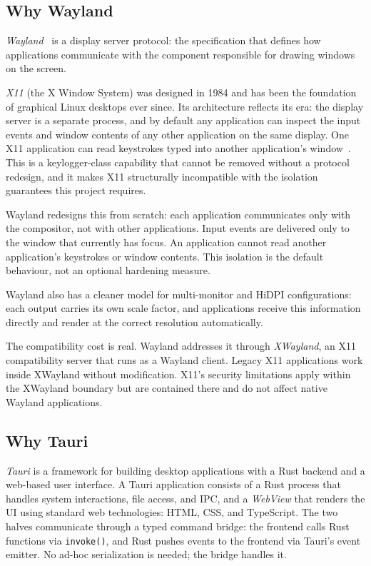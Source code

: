 \subsection{Why Wayland}
\label{sec:wayland-intro}

\emph{Wayland}~\cite{wayland} is a display server protocol: the specification
that defines how applications communicate with the component responsible for
drawing windows on the screen.

\emph{X11} (the X Window System) was designed in 1984 and has been the
foundation of graphical Linux desktops ever since. Its architecture reflects its
era: the display server is a separate process, and by default any application
can inspect the input events and window contents of any other application on the
same display. One X11 application can read keystrokes typed into another
application's window~\cite{x11:security}. This is a keylogger-class capability
that cannot be removed without a protocol redesign, and it makes X11
structurally incompatible with the isolation guarantees this project requires.

Wayland redesigns this from scratch: each application communicates only with the
compositor, not with other applications. Input events are delivered only to the
window that currently has focus. An application cannot read another
application's keystrokes or window contents. This isolation is the default
behaviour, not an optional hardening measure.

Wayland also has a cleaner model for multi-monitor and HiDPI configurations:
each output carries its own scale factor, and applications receive this
information directly and render at the correct resolution automatically.

The compatibility cost is real. Wayland addresses it through \emph{XWayland},
an X11 compatibility server that runs as a Wayland client. Legacy X11
applications work inside XWayland without modification. X11's security
limitations apply within the XWayland boundary but are contained there and do
not affect native Wayland applications.

\subsection{Why Tauri}
\label{sec:tauri-intro}

\emph{Tauri} is a framework for building desktop applications with a Rust
backend and a web-based user interface. A Tauri application consists of a Rust
process that handles system interactions, file access, and IPC, and a
\emph{WebView} that renders the UI using standard web technologies: HTML, CSS,
and TypeScript. The two halves communicate through a typed command bridge: the
frontend calls Rust functions via \texttt{invoke()}, and Rust pushes events to
the frontend via Tauri's event emitter. No ad-hoc serialization is needed; the
bridge handles it.


